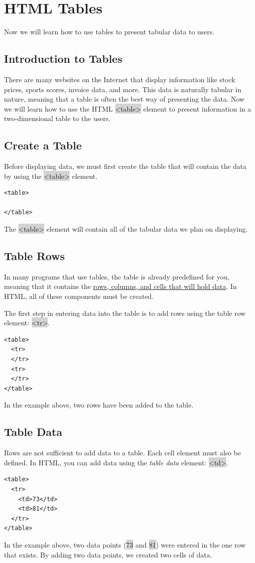 \documentclass[11pt]{article}
\begin{document}
\newpage
\section{HTML Tables}
Now we will learn how to use tables to present tabular data to users.
\subsection{Introduction to Tables}
There are many websites on the Internet that display information like stock prices, sports scores, invoice data, and more. This data is naturally tabular in nature, meaning that a table is often the best way of presenting the data. Now we will learn how to use the HTML \colorbox{lightgray}{<table>} element to present information in a two-dimensional table to the users.

\subsection{Create a Table}
Before displaying data, we must first create the table that will contain the data by using the \colorbox{lightgray}{<table>} element.
\begin{lstlisting}
<table>

</table>
\end{lstlisting}
The \colorbox{lightgray}{<table>} element will contain all of the tabular data we plan on displaying.

\subsection{Table Rows}
In many programs that use tables, the table is already predefined for you, meaning that it contains the \href{https://en.wikipedia.org/wiki/Table_(information)}{rows, columns, and cells that will hold data}. In HTML, all of these components must be created.

The first step in entering data into the table is to add rows using the table row element: \colorbox{lightgray}{<tr>}.
\begin{lstlisting}
<table>
  <tr>
  </tr>
  <tr>
  </tr>
</table>
\end{lstlisting}
In the example above, two rows have been added to the table.

\subsection{Table Data}
Rows are not sufficient to add data to a table. Each cell element must also be defined. In HTML, you can add data using the \textit{table data} element: \colorbox{lightgray}{<td>}.
\begin{lstlisting}
<table>
  <tr>
    <td>73</td>
    <td>81</td>
  </tr>
</table>
\end{lstlisting}
In the example above, two data points (\colorbox{lightgray}{73} and \colorbox{lightgray}{81}) were entered in the one row that exists. By adding two data points, we created two cells of data.
\end{document}
